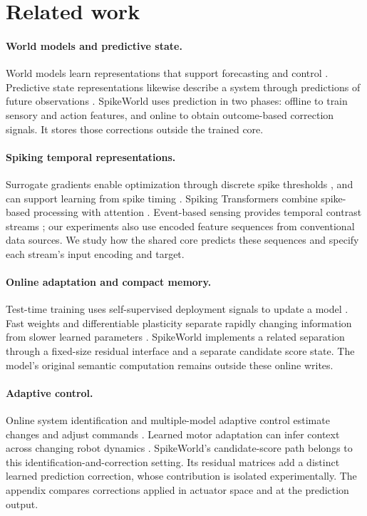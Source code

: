 \section{Related work}
\paragraph{World models and predictive state.}
World models learn representations that support forecasting and control
\citep{ha2018worldmodels,hafner2019planet,hafner2020dreamer}.
Predictive state representations likewise describe a system through predictions
of future observations \citep{littman2002predictive}.
SpikeWorld uses prediction in two phases: offline to train sensory and action
features, and online to obtain outcome-based correction signals. It stores those corrections outside the trained core.

\paragraph{Spiking temporal representations.}
Surrogate gradients enable optimization through discrete spike thresholds
\citep{neftci2019surrogate,zenke2018superspike}, and can support learning from
spike timing \citep{yu2026beyondrate}. Spiking Transformers combine spike-based
processing with attention \citep{zhou2023spikformer}. Event-based sensing
provides temporal contrast streams \citep{gallego2022event}; our experiments
also use encoded feature sequences from conventional data sources. We study how the shared core predicts these sequences and specify each
stream's input encoding and target.

\paragraph{Online adaptation and compact memory.}
Test-time training uses self-supervised deployment signals to update a model
\citep{sun2020ttt}. Fast weights and differentiable plasticity separate rapidly
changing information from slower learned parameters
\citep{ba2016fastweights,miconi2018plasticity}. SpikeWorld implements a related
separation through a fixed-size residual interface and a separate candidate
score state. The model's original semantic computation remains outside these
online writes.

\paragraph{Adaptive control.}
Online system identification and multiple-model adaptive control estimate
changes and adjust commands \citep{narendra1997multiple,yu2017uposi}.
Learned motor adaptation can infer context across changing robot dynamics
\citep{kumar2021rma}. SpikeWorld's candidate-score path belongs to this
identification-and-correction setting. Its residual matrices add a distinct
learned prediction correction, whose contribution is isolated experimentally.
The appendix compares corrections applied in actuator space and at the
prediction output.
